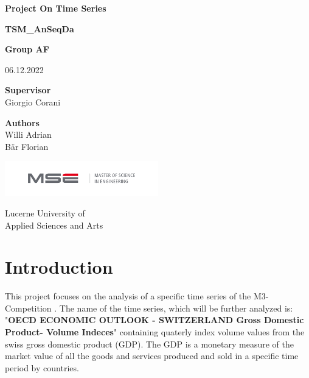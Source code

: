 \documentclass[10pt]{article}
\begin{document}
\begin{titlepage}
    \begin{center}
        \vspace*{1cm}
            
        \Huge
        \textbf{Project On Time Series}
            
        \vspace{0.5cm}
        \LARGE
        \textbf{TSM\_AnSeqDa}
        
        \vspace{0.5cm}
        \LARGE
        \textbf{Group AF}

        \vspace{1cm}
        \Large
        06.12.2022
        

        \Large
        \vspace{2.5cm}
        \textbf{Supervisor}\\ Giorgio Corani

        \vspace{0.5cm}
        \textbf{Authors}\\
        Willi Adrian\\
        Bär Florian
            
  
            
        \vfill
            
            
        
    
        
            
            
        \vspace{0.8cm}
            
        \includegraphics[width=0.5\textwidth]{mse.png}
            
        \Large
        Lucerne University of\\
        Applied Sciences and Arts\\
        
            
    \end{center}
\end{titlepage}




\section{Introduction}
This project focuses on the analysis of a specific time series of the M3-Competition \autocite{Makridakis1982-kv}. The name of the time series, which will be further analyzed is: "\textbf{OECD ECONOMIC OUTLOOK - SWITZERLAND Gross Domestic Product- Volume Indeces}" containing quaterly index volume values from the swiss gross domestic product (GDP). The GDP is a monetary measure of the market value of all the goods and services produced and sold in a specific time period by countries.
\end{document}
